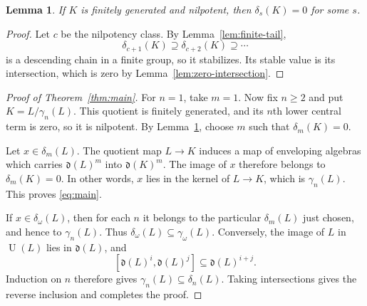 \documentclass[10pt]{article}
\newtheorem{lemma}{Lemma}
\newcommand{\U}{\operatorname U}
\newcommand{\dlt}{\delta}
\newcommand{\gm}{\gamma}
\begin{document}
\begin{lemma}\label{lem:nilpotent}
If $K$ is finitely generated and nilpotent, then $\dlt_s(K)=0$ for some $s$.
\end{lemma}

\begin{proof}
Let $c$ be the nilpotency class.  By Lemma~\ref{lem:finite-tail},
\[
 \dlt_{c+1}(K)\supseteq\dlt_{c+2}(K)\supseteq\cdots
\]
is a descending chain in a finite group, so it stabilizes.  Its stable value
is its intersection, which is zero by Lemma~\ref{lem:zero-intersection}.
\end{proof}

\begin{proof}[Proof of Theorem~\ref{thm:main}]
For $n=1$, take $m=1$.  Now fix $n\ge2$ and put
$K=L/\gm_n(L)$.  This quotient is finitely generated, and its $n$th lower
central term is zero, so it is nilpotent.  By
Lemma~\ref{lem:nilpotent}, choose $m$ such that $\dlt_m(K)=0$.

Let $x\in\dlt_m(L)$.  The quotient map $L\to K$ induces a map of
enveloping algebras which carries $\mathfrak d(L)^m$ into
$\mathfrak d(K)^m$.  The image of $x$ therefore belongs to
$\dlt_m(K)=0$.  In other words, $x$ lies in the kernel of $L\to K$, which
is $\gm_n(L)$.  This proves \eqref{eq:main}.

If $x\in\dlt_\omega(L)$, then for each $n$ it belongs to the particular
$\dlt_m(L)$ just chosen, and hence to $\gm_n(L)$.  Thus
$\dlt_\omega(L)\subseteq\gm_\omega(L)$.  Conversely, the image of $L$ in
$\U(L)$ lies in $\mathfrak d(L)$, and
\[
 [\mathfrak d(L)^i,\mathfrak d(L)^j]
        \subseteq\mathfrak d(L)^{i+j}.
\]
Induction on $n$ therefore gives $\gm_n(L)\subseteq\dlt_n(L)$.  Taking
intersections gives the reverse inclusion and completes the proof.
\end{proof}
\end{document}
